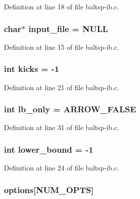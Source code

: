 Definition at line 18 of file baltsp-ib.c.\hypertarget{bin_2baltsp-ib_8c_a4f3a15de34c409bdec6ceacf93078ed}{
\subsubsection[{input\_\-file}]{\setlength{\rightskip}{0pt plus 5cm}char$\ast$ {\bf input\_\-file} = NULL}}
\label{bin_2baltsp-ib_8c_a4f3a15de34c409bdec6ceacf93078ed}




Definition at line 15 of file baltsp-ib.c.\hypertarget{bin_2baltsp-ib_8c_b8f057ba1ad6b7f0c46f8140b25b3467}{
\subsubsection[{kicks}]{\setlength{\rightskip}{0pt plus 5cm}int {\bf kicks} = -1}}
\label{bin_2baltsp-ib_8c_b8f057ba1ad6b7f0c46f8140b25b3467}




Definition at line 21 of file baltsp-ib.c.\hypertarget{bin_2baltsp-ib_8c_f328dea7847a1b1888dc14a570d0ec45}{
\subsubsection[{lb\_\-only}]{\setlength{\rightskip}{0pt plus 5cm}int {\bf lb\_\-only} = ARROW\_\-FALSE}}
\label{bin_2baltsp-ib_8c_f328dea7847a1b1888dc14a570d0ec45}




Definition at line 31 of file baltsp-ib.c.\hypertarget{bin_2baltsp-ib_8c_ed7394fd8e0c2796b26b9654fd10fd9d}{
\subsubsection[{lower\_\-bound}]{\setlength{\rightskip}{0pt plus 5cm}int {\bf lower\_\-bound} = -1}}
\label{bin_2baltsp-ib_8c_ed7394fd8e0c2796b26b9654fd10fd9d}




Definition at line 24 of file baltsp-ib.c.\hypertarget{bin_2baltsp-ib_8c_cea6a9709d519c143f30db401a0d0c72}{
\subsubsection[{options}]{ {\bf options}\mbox{[}NUM\_\-OPTS\mbox{]}}}
\label{bin_2baltsp-ib_8c_cea6a9709d519c143f30db401a0d0c72}




